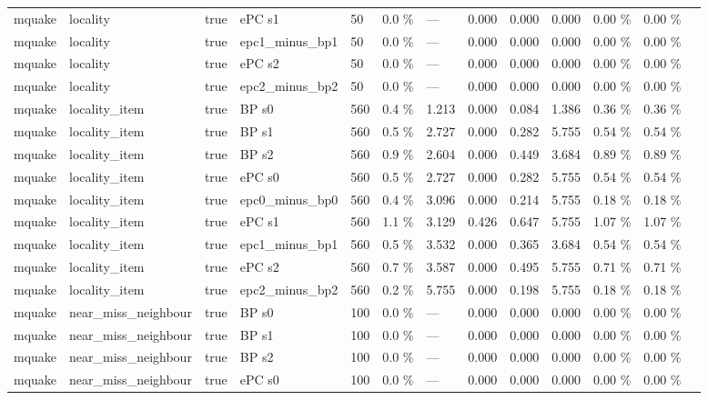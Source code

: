 \documentclass[10pt,a4paper]{article}
\begin{document}
\begin{center}
\begin{tabularx}{\textwidth}{@{}p{}XXXXXXXXXXXX@{}}
mquake & locality & true & ePC s1 & 50 & 0.0 \% & — & 0.000 & 0.000 & 0.000 & 0.00 \% & 0.00 \% &  \\
mquake & locality & true & epc1\_minus\_bp1 & 50 & 0.0 \% & — & 0.000 & 0.000 & 0.000 & 0.00 \% & 0.00 \% &  \\
mquake & locality & true & ePC s2 & 50 & 0.0 \% & — & 0.000 & 0.000 & 0.000 & 0.00 \% & 0.00 \% &  \\
mquake & locality & true & epc2\_minus\_bp2 & 50 & 0.0 \% & — & 0.000 & 0.000 & 0.000 & 0.00 \% & 0.00 \% &  \\
mquake & locality\_item & true & BP s0 & 560 & 0.4 \% & 1.213 & 0.000 & 0.084 & 1.386 & 0.36 \% & 0.36 \% &  \\
mquake & locality\_item & true & BP s1 & 560 & 0.5 \% & 2.727 & 0.000 & 0.282 & 5.755 & 0.54 \% & 0.54 \% &  \\
mquake & locality\_item & true & BP s2 & 560 & 0.9 \% & 2.604 & 0.000 & 0.449 & 3.684 & 0.89 \% & 0.89 \% &  \\
mquake & locality\_item & true & ePC s0 & 560 & 0.5 \% & 2.727 & 0.000 & 0.282 & 5.755 & 0.54 \% & 0.54 \% &  \\
mquake & locality\_item & true & epc0\_minus\_bp0 & 560 & 0.4 \% & 3.096 & 0.000 & 0.214 & 5.755 & 0.18 \% & 0.18 \% &  \\
mquake & locality\_item & true & ePC s1 & 560 & 1.1 \% & 3.129 & 0.426 & 0.647 & 5.755 & 1.07 \% & 1.07 \% &  \\
mquake & locality\_item & true & epc1\_minus\_bp1 & 560 & 0.5 \% & 3.532 & 0.000 & 0.365 & 3.684 & 0.54 \% & 0.54 \% &  \\
mquake & locality\_item & true & ePC s2 & 560 & 0.7 \% & 3.587 & 0.000 & 0.495 & 5.755 & 0.71 \% & 0.71 \% &  \\
mquake & locality\_item & true & epc2\_minus\_bp2 & 560 & 0.2 \% & 5.755 & 0.000 & 0.198 & 5.755 & 0.18 \% & 0.18 \% &  \\
mquake & near\_miss\_neighbour & true & BP s0 & 100 & 0.0 \% & — & 0.000 & 0.000 & 0.000 & 0.00 \% & 0.00 \% &  \\
mquake & near\_miss\_neighbour & true & BP s1 & 100 & 0.0 \% & — & 0.000 & 0.000 & 0.000 & 0.00 \% & 0.00 \% &  \\
mquake & near\_miss\_neighbour & true & BP s2 & 100 & 0.0 \% & — & 0.000 & 0.000 & 0.000 & 0.00 \% & 0.00 \% &  \\
mquake & near\_miss\_neighbour & true & ePC s0 & 100 & 0.0 \% & — & 0.000 & 0.000 & 0.000 & 0.00 \% & 0.00 \% &  \\

\end{tabularx}
\end{center}
\end{document}
